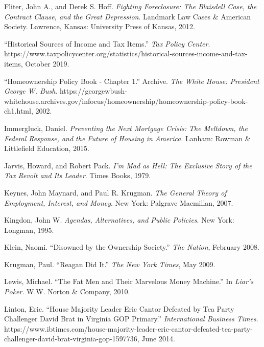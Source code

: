 \documentclass[
]{article}
\begin{document}
\leavevmode\hypertarget{ref-fliter2012fighting}{}%
Fliter, John A., and Derek S. Hoff. \emph{Fighting Foreclosure: The Blaisdell Case, the Contract Clause, and the Great Depression}. Landmark Law Cases \& American Society. Lawrence, Kansas: University Press of Kansas, 2012.

\leavevmode\hypertarget{ref-2019historical}{}%
``Historical Sources of Income and Tax Items.'' \emph{Tax Policy Center}. https://www.taxpolicycenter.org/statistics/historical-sources-income-and-tax-items, October 2019.

\leavevmode\hypertarget{ref-2002homeownership}{}%
``Homeownership Policy Book - Chapter 1.'' Archive. \emph{The White House: President George W. Bush}. https://georgewbush-whitehouse.archives.gov/infocus/homeownership/homeownership-policy-book-ch1.html, 2002.

\leavevmode\hypertarget{ref-immergluckPreventingNextMortgage2015}{}%
Immergluck, Daniel. \emph{Preventing the Next Mortgage Crisis: The Meltdown, the Federal Response, and the Future of Housing in America}. Lanham: Rowman \& Littlefield Education, 2015.

\leavevmode\hypertarget{ref-jarvis1979mad}{}%
Jarvis, Howard, and Robert Pack. \emph{I'm Mad as Hell: The Exclusive Story of the Tax Revolt and Its Leader}. Times Books, 1979.

\leavevmode\hypertarget{ref-keynes2007general}{}%
Keynes, John Maynard, and Paul R. Krugman. \emph{The General Theory of Employment, Interest, and Money}. New York: Palgrave Macmillan, 2007.

\leavevmode\hypertarget{ref-kingdon1995agendas}{}%
Kingdon, John W. \emph{Agendas, Alternatives, and Public Policies}. New York: Longman, 1995.

\leavevmode\hypertarget{ref-klein2008disowned}{}%
Klein, Naomi. ``Disowned by the Ownership Society.'' \emph{The Nation}, February 2008.

\leavevmode\hypertarget{ref-krugman2009reagan}{}%
Krugman, Paul. ``Reagan Did It.'' \emph{The New York Times}, May 2009.

\leavevmode\hypertarget{ref-lewis2010fat}{}%
Lewis, Michael. ``The Fat Men and Their Marvelous Money Machine.'' In \emph{Liar's Poker}. W.W. Norton \& Company, 2010.

\leavevmode\hypertarget{ref-linton2014house}{}%
Linton, Eric. ``House Majority Leader Eric Cantor Defeated by Tea Party Challenger David Brat in Virginia GOP Primary.'' \emph{International Business Times}. https://www.ibtimes.com/house-majority-leader-eric-cantor-defeated-tea-party-challenger-david-brat-virginia-gop-1597736, June 2014.
\end{document}
